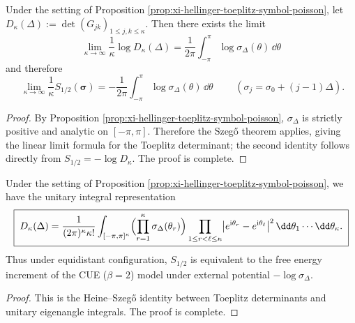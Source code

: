\begin{theorem}\label{thm:xi-hellinger-toeplitz-szego-thermo-limit}
Under the setting of Proposition \ref{prop:xi-hellinger-toeplitz-symbol-poisson}, let
\(
D_\kappa(\Delta):=\det(G_{jk})_{1\le j,k\le\kappa}
\).
Then there exists the limit
\[
\boxed{\;
\lim_{\kappa\to\infty}\frac{1}{\kappa}\log D_\kappa(\Delta)
=\frac{1}{2\pi}\int_{-\pi}^{\pi}\log\sigma_\Delta(\theta)\,\dd\theta\;}
\]
and therefore
\[
\boxed{\;
\lim_{\kappa\to\infty}\frac{1}{\kappa}S_{1/2}(\boldsymbol{\sigma})
=-\frac{1}{2\pi}\int_{-\pi}^{\pi}\log\sigma_\Delta(\theta)\,\dd\theta\;}
\qquad(\sigma_j=\sigma_0+(j-1)\Delta).
\]
\end{theorem}
\begin{proof}
By Proposition \ref{prop:xi-hellinger-toeplitz-symbol-poisson}, \(\sigma_\Delta\) is strictly positive and analytic on \([-\pi,\pi]\).
Therefore the Szeg\H{o} theorem applies, giving the linear limit formula for the Toeplitz determinant; the second identity follows directly from \(S_{1/2}=-\log D_\kappa\). The proof is complete.
\end{proof}

\begin{proposition}\label{prop:xi-hellinger-toeplitz-heine-szego-cue}
Under the setting of Proposition \ref{prop:xi-hellinger-toeplitz-symbol-poisson}, we have the unitary integral representation
\[
\boxed{\;
D_\kappa(\Delta)
=\frac{1}{(2\pi)^\kappa\kappa!}
\int_{[-\pi,\pi]^\kappa}
\Bigl(\prod_{r=1}^{\kappa}\sigma_\Delta(\theta_r)\Bigr)
\prod_{1\le r<\ell\le\kappa}\bigl|e^{\mathrm{i}\theta_r}-e^{\mathrm{i}\theta_\ell}\bigr|^2\,
\dd\theta_1\cdots\dd\theta_\kappa.\;}
\]
Thus under equidistant configuration, \(S_{1/2}\) is equivalent to the free energy increment of the CUE (\(\beta=2\)) model under external potential \(-\log\sigma_\Delta\).
\end{proposition}
\begin{proof}
This is the Heine--Szeg\H{o} identity between Toeplitz determinants and unitary eigenangle integrals. The proof is complete.
\end{proof}

